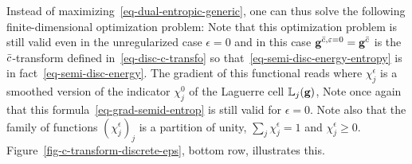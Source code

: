 Instead of maximizing~\eqref{eq-dual-entropic-generic}, one can thus solve the following finite-dimensional optimization problem:
Note that this optimization problem is still valid even in the unregularized case $\epsilon=0$ and in this case $\mathrm{\textbf{g}}^{\bar{c},\varepsilon=0}=\mathrm{\textbf{g}}^{\bar{c}}$ is the $\bar {c}$-transform defined in~\eqref{eq-disc-c-transfo} so that~\eqref{eq-semi-disc-energy-entropy} is in fact~\eqref{eq-semi-disc-energy}.
%
The gradient of this functional reads
where $\chi_j^\epsilon$ is a smoothed version of the indicator $\chi_j^0$ of the Laguerre cell $\mathbb{L}_{j}(\mathrm{\textbf{g}})$,
Note once again that this formula~\eqref{eq-grad-semid-entrop} is still valid for $\epsilon=0$.
%
Note also that the family of functions $( \chi_j^\epsilon )_j$ is a partition of unity, \ie $\sum_j \chi_j^\epsilon=1$ and $\chi_j^\epsilon \geq 0$. Figure~\ref{fig-c-transform-discrete-eps}, bottom row, illustrates this. 

